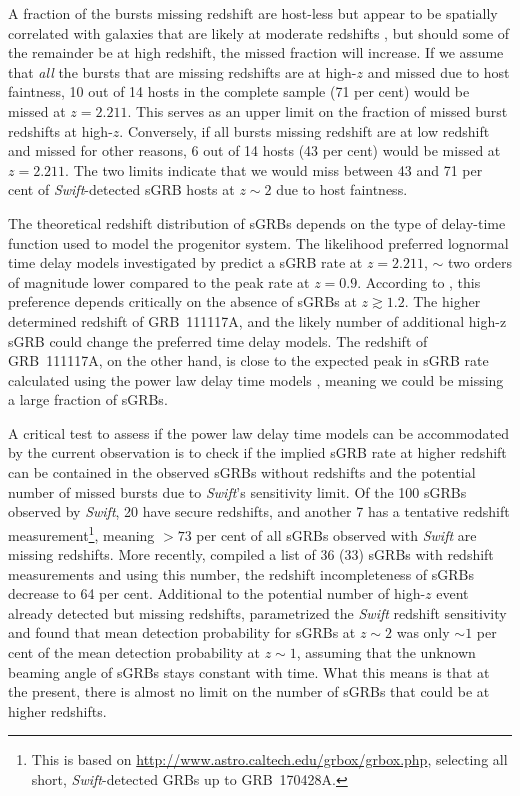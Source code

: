 \documentclass{aa}    %
\begin{document}
A fraction of the bursts missing redshift are host-less but appear to be
spatially correlated with galaxies that are likely at moderate redshifts
\citep{Tunnicliffe2014}, but should some of the remainder be at high redshift,
the missed fraction will increase. If we assume that \textit{all} the bursts
that are missing redshifts are at high-$z$ and missed due to host faintness, 10
out of 14 hosts in the complete sample (71 per cent) would be missed at $z =
2.211$. This serves as an upper limit on the fraction of missed burst redshifts
at high-$z$. Conversely, if all bursts missing redshift are at low redshift and
missed for other reasons, 6 out of 14 hosts (43 per cent) would be missed at $z
= 2.211$. The two limits indicate that we would miss between 43 and 71 per cent
of \textit{Swift}-detected sGRB hosts at $z \sim 2$ due to host faintness.

The theoretical redshift distribution of sGRBs depends on the type of delay-time
function used to model the progenitor system. The likelihood preferred lognormal
time delay models investigated by \citet{Wanderman2015} predict a sGRB rate at
$z = 2.211$, $\sim$ two orders of magnitude lower compared to the peak rate at
$z = 0.9$. According to \citet{Wanderman2015}, this preference depends
critically on the absence of sGRBs at $z \gtrsim 1.2$. The higher
determined redshift of GRB~111117A, and the likely number of additional high-z
sGRB could change the preferred time delay models. The redshift of GRB~111117A,
on the other hand, is close to the expected peak in sGRB rate calculated using
the power law delay time models \citep{Behroozi2014, Wanderman2015,
	Ghirlanda2016}, meaning we could be missing a large fraction of sGRBs.

A critical test to assess if the power law delay time models can be accommodated
by the current observation is to check if the implied sGRB rate at higher
redshift can be contained in the observed sGRBs without redshifts and the
potential number of missed bursts due to \textit{Swift}'s sensitivity limit. Of
the  100  sGRBs observed by \textit{Swift}, 20 have secure redshifts, and
another 7 has a tentative redshift measurement\footnote{This is based on
	\url{http://www.astro.caltech.edu/grbox/grbox.php}, selecting all short,
	\textit{Swift}-detected GRBs up to GRB~170428A.}, meaning $> 73$ per cent of all
sGRBs observed with \textit{Swift} are missing redshifts. More recently,
\citet{Fong2017} \citep{LIGOScientificCollaboration2017b} compiled a list of 36
(33) sGRBs with redshift measurements and using this number, the redshift
incompleteness of sGRBs decrease to 64 per cent. Additional to the potential
number of high-$z$ event already detected but missing redshifts,
\citet{Behroozi2014} parametrized the \textit{Swift} redshift sensitivity and
found that mean detection probability for sGRBs at $z \sim2$ was only $\sim1$
per cent of the mean detection probability at $z \sim1$, assuming that the
unknown beaming angle of sGRBs stays constant with time. What this means is that
at the present, there is almost no limit on the number of sGRBs that could be at
higher redshifts.
\end{document}
